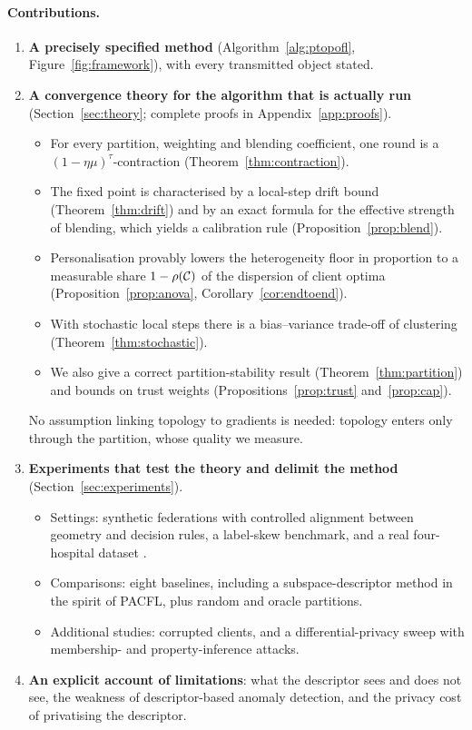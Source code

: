 \paragraph{Contributions.}
\begin{enumerate}[leftmargin=1.4em,itemsep=2pt]
  \item \textbf{A precisely specified method} (Algorithm~\ref{alg:ptopofl},
    Figure~\ref{fig:framework}), with every transmitted object stated.
  \item \textbf{A convergence theory for the algorithm that is actually run}
    (Section~\ref{sec:theory}; complete proofs in Appendix~\ref{app:proofs}).
    \begin{itemize}[leftmargin=1.2em,itemsep=1pt]
      \item For every partition, weighting and blending coefficient, one round is a
        $(1-\eta\mu)^{\tau}$-contraction (Theorem~\ref{thm:contraction}).
      \item The fixed point is characterised by a local-step drift bound
        (Theorem~\ref{thm:drift}) and by an exact formula for the effective strength of
        blending, which yields a calibration rule (Proposition~\ref{prop:blend}).
      \item Personalisation provably lowers the heterogeneity floor in proportion to a
        measurable share $1-\rho(\mathcal{C})$ of the dispersion of client optima
        (Proposition~\ref{prop:anova}, Corollary~\ref{cor:endtoend}).
      \item With stochastic local steps there is a bias--variance trade-off of clustering
        (Theorem~\ref{thm:stochastic}).
      \item We also give a correct partition-stability result (Theorem~\ref{thm:partition})
        and bounds on trust weights (Propositions~\ref{prop:trust} and~\ref{prop:cap}).
    \end{itemize}
    No assumption linking topology to gradients is needed: topology enters only through
    the partition, whose quality we measure.
  \item \textbf{Experiments that test the theory and delimit the method}
    (Section~\ref{sec:experiments}).
    \begin{itemize}[leftmargin=1.2em,itemsep=1pt]
      \item Settings: synthetic federations with controlled alignment between geometry and
        decision rules, a label-skew benchmark, and a real four-hospital dataset
        \citep{detrano1989international,terrail2022flamby}.
      \item Comparisons: eight baselines, including a subspace-descriptor method in the
        spirit of PACFL, plus random and oracle partitions.
      \item Additional studies: corrupted clients, and a differential-privacy sweep with
        membership- and property-inference attacks.
    \end{itemize}
  \item \textbf{An explicit account of limitations}: what the descriptor sees and does not
    see, the weakness of descriptor-based anomaly detection, and the privacy cost of
    privatising the descriptor.
\end{enumerate}

